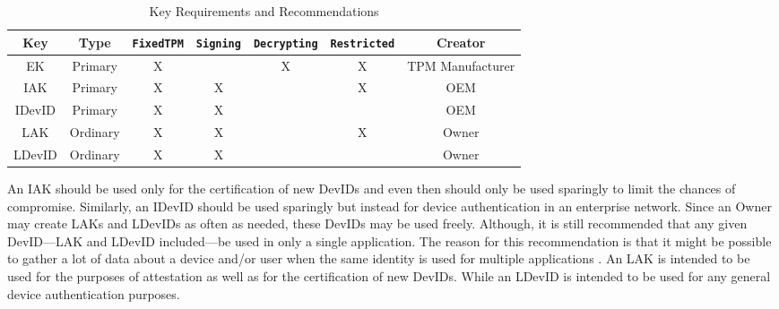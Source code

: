 \begin{table}[h]
  \begin{center}
    \scriptsize 
    \sffamily
    \renewcommand{\arraystretch}{1.5}
    \begin{tabular}{ |c|c|c|c|c|c|c| }
      \hline
      Key & Type & \verb|FixedTPM| & \verb|Signing| & \verb|Decrypting| & \verb|Restricted| & Creator \\
      \hline
      \hline
      EK & Primary       & X &   & X & X & TPM Manufacturer \\
      \hline
      IAK & Primary      & X & X &   & X & OEM \\
      \hline
      IDevID & Primary   & X & X &   &   & OEM \\
      \hline
      LAK & Ordinary     & X & X &   & X & Owner \\
      \hline
      LDevID & Ordinary  & X & X &   &   & Owner \\
      \hline
    \end{tabular}
    \caption{Key Requirements and Recommendations}
    \label{fig:req_and_recs}
  \end{center}
\end{table}

 
 An IAK should be used only for the certification of new DevIDs and even then should only be used sparingly to limit the chances of compromise. Similarly, an IDevID should be used sparingly but instead for device authentication in an enterprise network. Since an Owner may create LAKs and LDevIDs as often as needed, these DevIDs may be used freely. Although, it is still recommended that any given DevID---LAK and LDevID included---be used in only a single application. The reason for this recommendation is that it might be possible to gather a lot of data about a device and/or user when the same identity is used for multiple applications \cite{DevIDSpec-TCG}. An LAK is intended to be used for the purposes of attestation as well as for the certification of new DevIDs. While an LDevID is intended to be used for any general device authentication purposes.

